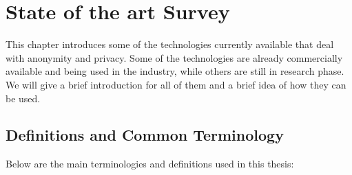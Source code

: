 \chapter{State of the art Survey}

This chapter introduces some of the technologies currently available that deal with anonymity and privacy. Some of the technologies are already commercially available and being used in the industry, while others are still in research phase. We will give a brief introduction for all of them and a brief idea of how they can be used.

\section{Definitions and Common Terminology}
Below are the main terminologies and definitions used in this thesis:

